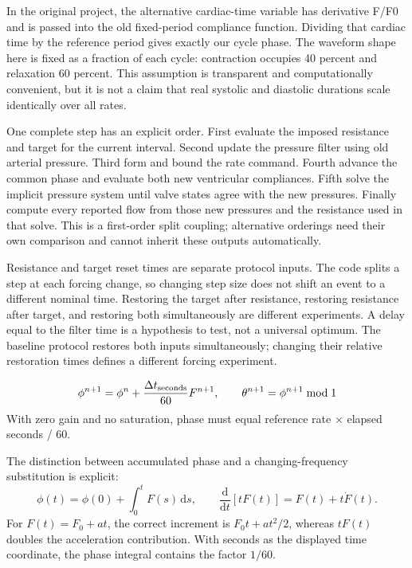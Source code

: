 \documentclass[11pt,letterpaper]{article}
\theoremstyle{definition}\newtheorem{definition}{Definition}\newtheorem{example}{Example}
\numberwithin{equation}{section}
\begin{document}
In the original project, the alternative cardiac-time variable has derivative F/F0 and is passed into the old fixed-period compliance function. Dividing that cardiac time by the reference period gives exactly our cycle phase. The waveform shape here is fixed as a fraction of each cycle: contraction occupies 40 percent and relaxation 60 percent. This assumption is transparent and computationally convenient, but it is not a claim that real systolic and diastolic durations scale identically over all rates.

One complete step has an explicit order. First evaluate the imposed resistance and target for the current interval. Second update the pressure filter using old arterial pressure. Third form and bound the rate command. Fourth advance the common phase and evaluate both new ventricular compliances. Fifth solve the implicit pressure system until valve states agree with the new pressures. Finally compute every reported flow from those new pressures and the resistance used in that solve. This is a first-order split coupling; alternative orderings need their own comparison and cannot inherit these outputs automatically.

Resistance and target reset times are separate protocol inputs. The code splits a step at each forcing change, so changing step size does not shift an event to a different nominal time. Restoring the target after resistance, restoring resistance after target, and restoring both simultaneously are different experiments. A delay equal to the filter time is a hypothesis to test, not a universal optimum. The baseline protocol restores both inputs simultaneously; changing their relative restoration times defines a different forcing experiment.

\[
\phi^{n+1}=\phi^n+\frac{\Delta t_{\rm seconds}}{60}F^{n+1},\qquad \theta^{n+1}=\phi^{n+1}\bmod 1
\]
With zero gain and no saturation, phase must equal reference rate \ensuremath{\times} elapsed seconds / 60.

The distinction between accumulated phase and a changing-frequency substitution is explicit:
\[
 \phi(t)=\phi(0)+\int_0^tF(s)\,\mathrm ds,
 \qquad\frac{\mathrm d}{\mathrm dt}[tF(t)]=F(t)+t\dot F(t).
\]
For $F(t)=F_0+at$, the correct increment is $F_0t+at^2/2$, whereas $tF(t)$ doubles the acceleration contribution. With seconds as the displayed time coordinate, the phase integral contains the factor $1/60$.
\end{document}
